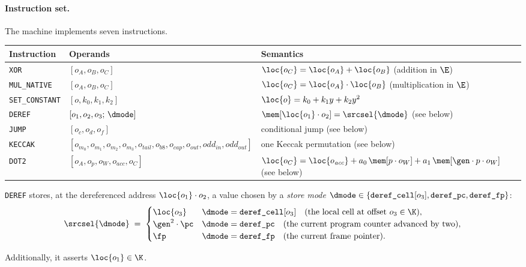 \paragraph{Instruction set.} The machine implements seven instructions.
\begin{center}
\begin{tabularx}{\textwidth}{@{}llX@{}}
\hline
Instruction & Operands & Semantics\\
\hline
\texttt{XOR}           & $[o_A,o_B,o_C]$ & $\loc{o_C}=\loc{o_A}+\loc{o_B}$ \quad(addition in $\E$)\\
\texttt{MUL\_NATIVE}   & $[o_A,o_B,o_C]$ & $\loc{o_C}=\loc{o_A}\cdot\loc{o_B}$ (multiplication in $\E$)\\
\texttt{SET\_CONSTANT} & $[o,k_0,k_1,k_2]$ & $\loc{o}=k_0+k_1y+k_2y^{2}$\\
\texttt{DEREF}         & $[o_1,o_2,o_3;\,\dmode]$ & $\mem[\loc{o_1}\cdot o_2]=\srcsel{\dmode}$ (see below)\\
\texttt{JUMP}          & $[o_c,o_d,o_f]$ & conditional jump (see below)\\
\texttt{KECCAK}           & $[o_{m_0},o_{m_1},o_{m_2},o_{m_3},o_{\mathit{tail}},o_{\mathit{b8}},o_{\mathit{cap}},o_{\mathit{out}},\mathit{odd}_{\mathit{in}},\mathit{odd}_{\mathit{out}}]$ & one Keccak permutation (see below)\\
\texttt{DOT2}          & $[o_A,o_p,o_W,o_{\mathit{acc}},o_C]$ & $\loc{o_C}=\loc{o_{\mathit{acc}}}+a_0\,\mem[p\cdot o_W]+a_1\,\mem[\gen\cdot p\cdot o_W]$ (see below)\\
\hline
\end{tabularx}
\end{center}


\texttt{DEREF} stores, at the dereferenced address $\loc{o_1}\cdot o_2$, a value chosen by a \emph{store mode} $\dmode\in\{\texttt{deref\_cell}[o_3],\texttt{deref\_pc},\texttt{deref\_fp}\}$:
\[
  \srcsel{\dmode}\;=\;
  \begin{cases}
    \loc{o_3} & \dmode=\texttt{deref\_cell}[o_3] \quad(\text{the local cell at offset }o_3 \in \K),\\
    \gen^{2}\cdot\pc & \dmode=\texttt{deref\_pc} \quad(\text{the current program counter advanced by two}),\\
    \fp & \dmode=\texttt{deref\_fp} \quad(\text{the current frame pointer}).
  \end{cases}
\]

Additionally, it asserts $\loc{o_1} \in \K$.

\vspace{5mm}


